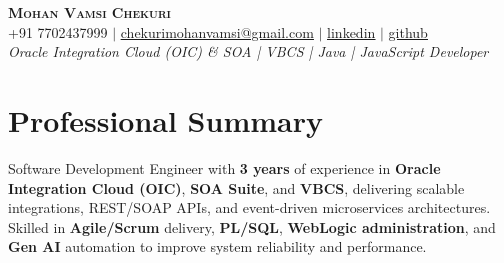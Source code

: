 \documentclass[letterpaper,11pt]{article}
\begin{document}
\begin{center}
    \textbf{\Huge \scshape Mohan Vamsi Chekuri} \\ \vspace{1pt}
    \small +91 7702437999 $|$ \href{mailto:chekurimohanvamsi@gmail.com}{\underline{chekurimohanvamsi@gmail.com}} $|$
    \href{https://www.linkedin.com/in/mvamsi73}{\underline{linkedin}} $|$
    \href{https://github.com}{\underline{github}}
    \\ \vspace{2pt}
    \small \textit{Oracle Integration Cloud (OIC) \& SOA | VBCS | Java | JavaScript Developer}
\end{center}

\vspace{-10pt}

\section{Professional Summary}
Software Development Engineer with \textbf{3 years} of experience in \textbf{Oracle Integration Cloud (OIC)}, \textbf{SOA Suite}, and \textbf{VBCS}, delivering scalable integrations, REST/SOAP APIs, and event-driven microservices architectures. Skilled in \textbf{Agile/Scrum} delivery, \textbf{PL/SQL}, \textbf{WebLogic administration}, and \textbf{Gen AI} automation to improve system reliability and performance.

\vspace{-4pt}
\end{document}

